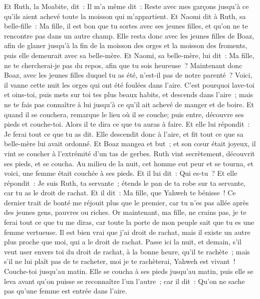 \begin{multicols}{2}
Et Ruth, la Moabite, dit~: Il m'a même dit~: Reste avec mes garçons jusqu'à ce qu'ils aient achevé toute la moisson qui m'appartient.
Et Naomi dit à Ruth, sa belle-fille~: Ma fille, il est bon que tu sortes avec ses jeunes filles, et qu'on ne te rencontre pas dans un autre champ.
Elle resta donc avec les jeunes filles de Boaz, afin de glaner jusqu'à la fin de la moisson des orges et la moisson des froments, puis elle demeurait avec sa belle-mère.
\VerseOne{}Et Naomi, sa belle-mère, lui dit~: Ma fille, ne te chercherai-je pas du repos, afin que tu sois heureuse~?
Maintenant donc Boaz, avec les jeunes filles duquel tu as été, n'est-il pas de notre parenté~? Voici, il vanne cette nuit les orges qui ont été foulées dans l'aire.
C'est pourquoi lave-toi et oins-toi, puis mets sur toi tes plus beaux habits, et descends dans l'aire~; mais ne te fais pas connaître à lui jusqu'à ce qu'il ait achevé de manger et de boire.
Et quand il se couchera, remarque le lieu où il se couche; puis entre, découvre ses pieds et couche-toi. Alors il te dira ce que tu auras à faire.
Et elle lui répondit~: Je ferai tout ce que tu as dit.
Elle descendit donc à l'aire, et fit tout ce que sa belle-mère lui avait ordonné.
Et Boaz mangea et but~; et son cœur était joyeux, il vint se coucher à l'extrémité d'un tas de gerbes. Ruth vint secrètement, découvrit ses pieds, et se coucha.
Au milieu de la nuit, cet homme eut peur et se tourna, et voici, une femme était couchée à ses pieds.
Et il lui dit~: Qui es-tu~? Et elle répondit~: Je suis Ruth, ta servante~; étends le pan de ta robe sur ta servante, car tu as le droit de rachat.
Et il dit~: Ma fille, que Yahweh te bénisse~! Ce dernier trait de bonté me réjouit plus que le premier, car tu n'es pas allée après des jeunes gens, pauvres ou riches.
Or maintenant, ma fille, ne crains pas, je te ferai tout ce que tu me diras, car toute la porte de mon peuple sait que tu es une femme vertueuse.
Il est bien vrai que j'ai droit de rachat, mais il existe un autre plus proche que moi, qui a le droit de rachat.
Passe ici la nuit, et demain, s'il veut user envers toi du droit de rachat, à la bonne heure, qu'il te rachète~; mais s'il ne lui plaît pas de te racheter, moi je te rachèterai, Yahweh est vivant~! Couche-toi jusqu'au matin.
Elle se coucha à ses pieds jusqu'au matin, puis elle se leva avant qu'on puisse se reconnaître l'un l'autre~; car il dit~: Qu'on ne sache pas qu'une femme est entrée dans l'aire.

\end{multicols}
